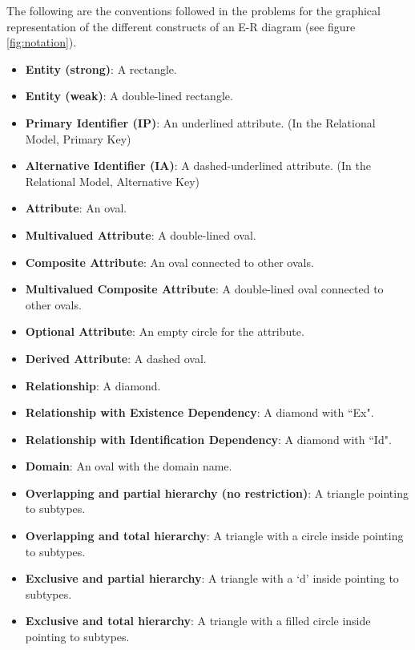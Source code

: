 \documentclass{article}
\begin{document}
The following are the conventions followed in the problems for the graphical representation of the different constructs of an E-R diagram (see figure \ref{fig:notation}).

\begin{itemize}
    \item \textbf{Entity (strong)}: A rectangle.
    \item \textbf{Entity (weak)}: A double-lined rectangle.
    \item \textbf{Primary Identifier (IP)}: An underlined attribute. (In the Relational Model, Primary Key)
    \item \textbf{Alternative Identifier (IA)}: A dashed-underlined attribute. (In the Relational Model, Alternative Key)
    \item \textbf{Attribute}: An oval.
    \item \textbf{Multivalued Attribute}: A double-lined oval.
    \item \textbf{Composite Attribute}: An oval connected to other ovals.
    \item \textbf{Multivalued Composite Attribute}: A double-lined oval connected to other ovals.
    \item \textbf{Optional Attribute}: An empty circle for the attribute.
    \item \textbf{Derived Attribute}: A dashed oval.
    \item \textbf{Relationship}: A diamond.
    \item \textbf{Relationship with Existence Dependency}: A diamond with ``Ex".
    \item \textbf{Relationship with Identification Dependency}: A diamond with ``Id".
    \item \textbf{Domain}: An oval with the domain name.
    \item \textbf{Overlapping and partial hierarchy (no restriction)}: A triangle pointing to subtypes.
    \item \textbf{Overlapping and total hierarchy}: A triangle with a circle inside pointing to subtypes.
    \item \textbf{Exclusive and partial hierarchy}: A triangle with a `d' inside pointing to subtypes.
    \item \textbf{Exclusive and total hierarchy}: A triangle with a filled circle inside pointing to subtypes.
\end{itemize}
\end{document}
